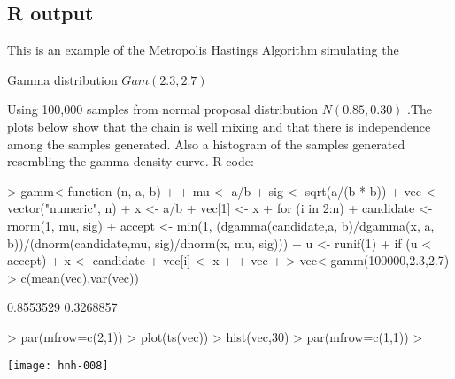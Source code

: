 \documentclass[11pt,a4paper]{article}
\theoremstyle{plain}
\begin{document}
\subsection*{R output}
This is an example of the Metropolis Hastings Algorithm simulating  the 
\begin{center}Gamma distribution $Gam(2.3,2.7)$
\end{center}
Using 100,000 samples from normal proposal distribution $N(0.85,0.30)$ .The plots below show that the chain is well mixing and that there is independence among the samples generated. Also a histogram of the samples generated resembling the gamma density curve.
\newline R code:
\begin{Schunk}
\begin{Sinput}
> gamm<-function (n, a, b) 
+ {
+   mu <- a/b
+   sig <- sqrt(a/(b * b))
+   vec <- vector("numeric", n)
+   x <- a/b
+   vec[1] <- x
+   for (i in 2:n) {
+     candidate <- rnorm(1, mu, sig)
+     accept <- min(1, (dgamma(candidate,a, b)/dgamma(x, a, b))/(dnorm(candidate,mu, sig)/dnorm(x, mu, sig)))
+     u <- runif(1)
+     if (u < accept) 
+       x <- candidate
+     vec[i] <- x
+   }
+   vec
+ }
> vec<-gamm(100000,2.3,2.7)
> c(mean(vec),var(vec))
\end{Sinput}
\begin{Soutput}
[1] 0.8553529 0.3268857
\end{Soutput}
\begin{Sinput}
> par(mfrow=c(2,1))
> plot(ts(vec))
> hist(vec,30)
> par(mfrow=c(1,1))
> 
\end{Sinput}
\end{Schunk}
\texttt{[image: hnh-008]}

\newpage
\end{document}
